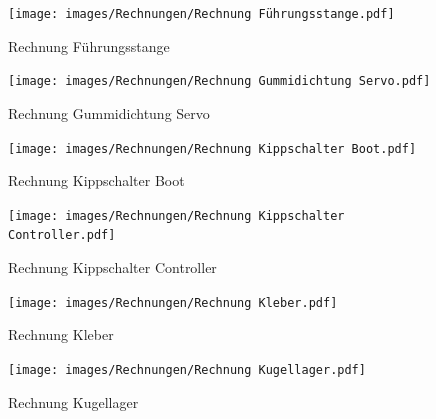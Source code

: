 \documentclass[a4paper,12pt]{article}
\begin{document}
\begin{figure}[H]
    \centering
    \begin{minipage}[b]{0.42\linewidth}
        \centering
        \texttt{[image: images/Rechnungen/Rechnung Führungsstange.pdf]}
        \caption{Rechnung Führungsstange}
        \label{fig:Rechnung Führungsstange}
    \end{minipage}
    \hspace{2.5em}  
    \begin{minipage}[b]{0.42\linewidth}
        \centering
        \texttt{[image: images/Rechnungen/Rechnung Gummidichtung Servo.pdf]}
        \caption{Rechnung Gummidichtung Servo}
        \label{fig:Rechnung Gummidichtung Servo}
    \end{minipage}
\end{figure}


\begin{figure}[H]
    \centering
    \begin{minipage}[b]{0.42\linewidth}
        \centering
        \texttt{[image: images/Rechnungen/Rechnung Kippschalter Boot.pdf]}
        \caption{Rechnung Kippschalter Boot}
        \label{fig:Rechnung Kippschalter Boot}
    \end{minipage}
    \hspace{2.5em}  
    \begin{minipage}[b]{0.42\linewidth}
        \centering
        \texttt{[image: images/Rechnungen/Rechnung Kippschalter Controller.pdf]}
        \caption{Rechnung Kippschalter Controller}
        \label{fig:Rechnung Kippschalter Controller}
    \end{minipage}
\end{figure}


\begin{figure}[H]
    \centering
    \begin{minipage}[b]{0.42\linewidth}
        \centering
        \texttt{[image: images/Rechnungen/Rechnung Kleber.pdf]}
        \caption{Rechnung Kleber}
        \label{fig:Rechnung Kleber}
    \end{minipage}
    \hspace{2.5em}  
    \begin{minipage}[b]{0.42\linewidth}
        \centering
        \texttt{[image: images/Rechnungen/Rechnung Kugellager.pdf]}
        \caption{Rechnung Kugellager}
        \label{fig:Rechnung Kugellager}
    \end{minipage}
\end{figure}
\end{document}
